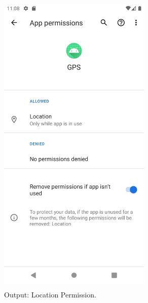 \documentclass[12pt, a4]{article}
\begin{document}
\newpage
\subsection*{}
\begin{figure}[h]
\centering
\caption{Output: Location Permission.}
\includegraphics[height=15cm, width=7.3cm]{GPS/Screenshots/Output-0.png}
\end{figure}

\newpage
\end{document}
